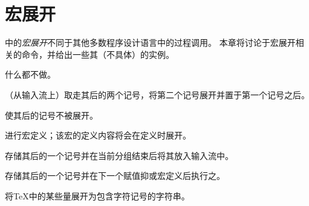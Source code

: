 \documentclass{book}
\begin{document}
\chapter{宏展开}\label{expand}

中的\emph{宏展开}不同于其他多数程序设计语言中的过程调用。
本章将讨论于宏展开相关的命令，并给出一些其（不具体）的实例。

\label{cschap:relax}\label{cschap:expandafter}\label{cschap:noexpand}\label{cschap:afterassignment}\label{cschap:the}
\begin{inventory}
\item [\cs{relax}] 
     什么都不做。


\item [\cs{expandafter}]  
      （从输入流上）取走其后的两个记号，将第二个记号展开并置于第一个记号之后。

\item [\cs{noexpand}]   
      使其后的记号不被展开。


\item [\cs{edef}] 
      进行宏定义；该宏的定义内容将会在定义时展开。
% 
 
\item [\cs{aftergroup}]  
      存储其后的一个记号并在当前分组结束后将其放入输入流中。

\item [\cs{afterassignment}]   
      存储其后的一个记号并在下一个赋值抑或宏定义后执行之。

\item [\cs{the}] 
      将{\TeX}中的某些量展开为包含字符记号的字符串。

\end{inventory}
\end{document}

